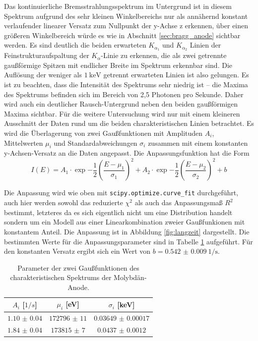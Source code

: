 
Das kontinuierliche Bremsstrahlungsspektrum im Untergrund ist in diesem Spektrum aufgrund des sehr kleinen Winkelbereichs nur als annähernd konstant verlaufender linearer Versatz zum Nullpunkt der y-Achse z erkennen, über einen größeren Winkelbereich würde es wie in Abschnitt \ref{sec:bragg_anode} sichtbar werden. Es sind deutlich die beiden erwarteten $K_{\alpha_1}$ und $K_{\alpha_2}$ Linien der Feinstrukturaufspaltung der $K_\alpha$-Linie zu erkennen, die als zwei getrennte gaußförmige Spitzen mit endlicher Breite im Spektrum erkennbar sind. Die Auflösung der weniger als $\SI{1}{\kilo\eV}$ getrennt erwarteten \cite{xraydatabooklet} Linien ist also gelungen.
Es ist zu beachten, dass die Intensität des Spektrums sehr niedrig ist -- die Maxima des Spektrums befinden sich im Bereich von 2,5 Photonen pro Sekunde. Daher wird auch ein deutlicher Rausch-Untergrund neben den beiden gaußförmigen Maxima sichtbar. Für die weitere Untersuchung wird nur mit einem kleineren Ausschnitt der Daten rund um die beiden charakteristischen Linien betrachtet. Es wird die Überlagerung von zwei Gaußfunktionen mit Amplituden $A_i$, Mittelwerten $\mu_i$ und Standardabweichungen $\sigma_i$ zusammen mit einem konstanten y-Achsen-Versatz an die Daten angepasst. Die Anpassungsfunktion hat die Form \[
I(E) = A_1\cdot \exp{-\frac{1}{2}(\frac{E-\mu_1}{\sigma_1})^2} + A_2\cdot \exp{-\frac{1}{2}(\frac{E-\mu_2}{\sigma_2})^2} + b
\]

Die Anpassung wird wie oben mit \texttt{scipy.optimize.curve\_fit} durchgeführt, auch hier werden sowohl das reduzierte
$\chi^2$ als auch das Anpassungsmaß $R^2$ bestimmt, letzteres da es sich eigentlich nicht um eine Distribution handelt sondern um ein Modell aus einer Linearkombination zweier Gaußfunkionen mit konstantem Anteil. Die Anpassung ist in Abbildung \ref{fig:langzeit} dargestellt. Die bestimmten Werte für die Anpassungsparameter sind in Tabelle \ref{tab:mo_params} aufgeführt. Für den konstanten Versatz ergibt sich ein Wert von $b=\num{0.542(9)}~\text{1/s}$.

\begin{table}[H]
	\centering
	\begin{tabular}{|c|c|c|} \hline
    $A_i$ [$\unit{1/s}$] & $\mu_i$ [eV] & $\sigma_i$ [keV] \\ \hline
    $\num{1.10(4)}$ & $\num{172796(11)}$ & $\num{0.03649(17)}$ \\
    $\num{1.84(4)}$ & $\num{173815(7)}$ & $\num{0.0437(12) }$ \\
    \hline
	\end{tabular}
	\caption{Parameter der zwei Gaußfunktionen des charakteristischen Spektrums der Molybdän-Anode.}
	\label{tab:mo_params}
\end{table}


